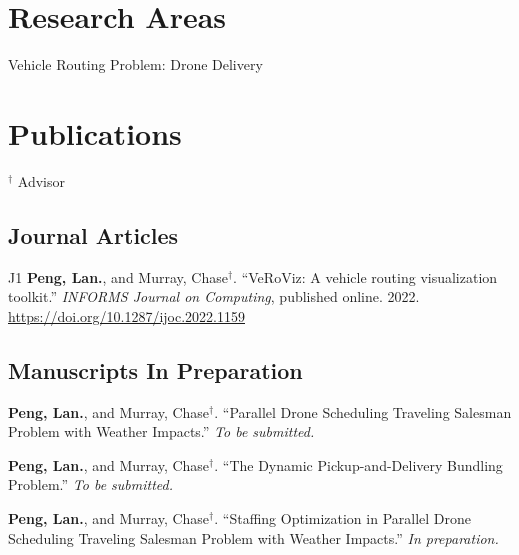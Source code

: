 \documentclass[12pt,letterpaper]{report}
\newcommand{\listitemspace}{0.25em}
\renewenvironment{itemize}
{\begin{list}{}{\setlength{\leftmargin}{0em}
                \setlength{\parskip}{0em}
                \setlength{\itemsep}{\listitemspace}
                \setlength{\parsep}{\listitemspace}}}
{\end{list}}
\begin{document}
    \section*{Research Areas}
    \begin{itemize}
        \item Vehicle Routing Problem: Drone Delivery
    \end{itemize}

    \section*{Publications}
    $^\dagger$ Advisor
    \subsection*{Journal Articles}
    \begin{tablist}
        \item[J1] \tab{}\textbf{Peng, Lan.}, and Murray, Chase$^\dagger$. \enquote{VeRoViz: A vehicle routing visualization toolkit.} \textit{INFORMS Journal on Computing}, published online. 2022. \href{https://pubsonline.informs.org/doi/abs/10.1287/ijoc.2022.1159}{https://doi.org/10.1287/ijoc.2022.1159}
    \end{tablist}

    \subsection*{Manuscripts In Preparation}
    \begin{tablist}
    \item[] \tab{}\textbf{Peng, Lan.}, and Murray, Chase$^\dagger$. \enquote{Parallel Drone Scheduling Traveling Salesman Problem with Weather Impacts.} \textit{To be submitted.}
    \item[] \tab{}\textbf{Peng, Lan.}, and Murray, Chase$^\dagger$. \enquote{The Dynamic Pickup-and-Delivery Bundling Problem.} \textit{To be submitted.}
    \item[] \tab{}\textbf{Peng, Lan.}, and Murray, Chase$^\dagger$. \enquote{Staffing Optimization in Parallel Drone Scheduling Traveling Salesman Problem with Weather Impacts.} \textit{In preparation.}
    \end{tablist}
\end{document}
